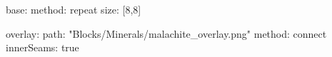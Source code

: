 base:
  method: repeat
  size: [8,8]

overlay:
  path: "Blocks/Minerals/malachite_overlay.png"
  method: connect
  innerSeams: true
  
